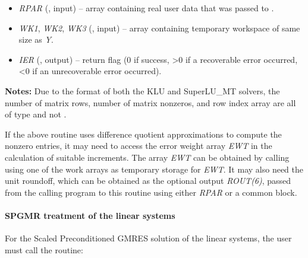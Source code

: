 \documentclass[letterpaper,10pt,english]{sphinxmanual}
\begin{document}
\begin{fulllineitems}
\begin{description}
\begin{itemize}
\item {} 
\emph{RPAR} (, input) -- array containing real user data that was passed to
{\hyperref[f_interface/Usage:f/_/FARKMALLOC]{}}.

\item {} 
\emph{WK1}, \emph{WK2}, \emph{WK3}  (, input) -- array containing temporary workspace
of same size as \emph{Y}.

\item {} 
\emph{IER} (, output) -- return flag (0 if success, \textgreater{}0 if a recoverable error
occurred, \textless{}0 if an unrecoverable error occurred).

\end{itemize}

\end{description}

\textbf{Notes:} Due to the format of both the KLU and SuperLU\_MT
solvers, the number of matrix rows, number of matrix nonzeros, and
row index array are all of type  and not .

\end{fulllineitems}


If the above routine uses difference quotient approximations to
compute the nonzero entries, it may need to access the error weight
array \emph{EWT} in the calculation of suitable increments. The array \emph{EWT}
can be obtained by calling {\hyperref[f_interface/Optional_output:f/_/FARKGETERRWEIGHTS]{}} using one of
the work arrays as temporary storage for \emph{EWT}.  It may also need the
unit roundoff, which can be obtained as the optional output \emph{ROUT(6)},
passed from the calling program to this routine using either \emph{RPAR} or
a common block.


\paragraph{SPGMR treatment of the linear systems}
\label{f_interface/Usage:spgmr-treatment-of-the-linear-systems}
For the Scaled Preconditioned GMRES solution of the linear systems,
the user must call the {\hyperref[f_interface/Usage:f/_/FARKSPGMR]{}} routine:
\end{document}
